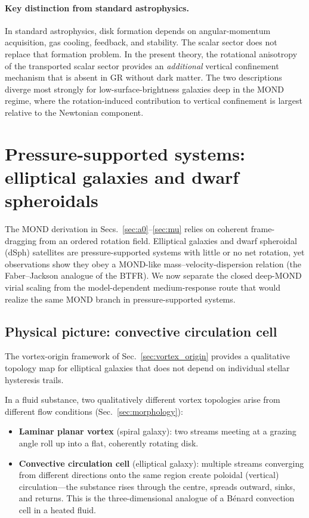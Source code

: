 \documentclass[11pt]{article}
\begin{document}
\paragraph{Key distinction from standard astrophysics.}
In standard astrophysics, disk formation depends on angular-momentum
acquisition, gas cooling, feedback, and stability.  The scalar sector
does not replace that formation problem.  In the present theory, the
rotational anisotropy of the transported scalar sector provides an
\emph{additional} vertical confinement mechanism that is absent in GR
without dark matter.  The two descriptions diverge most strongly for
low-surface-brightness galaxies deep in the MOND regime, where the
rotation-induced contribution to vertical confinement is largest
relative to the Newtonian component.

\section{Pressure-supported systems: elliptical galaxies and dwarf spheroidals}\label{sec:ellipticals}

The MOND derivation in Secs.~\ref{sec:a0}--\ref{sec:mu} relies on
coherent frame-dragging from an ordered rotation field.  Elliptical
galaxies and dwarf spheroidal (dSph) satellites are pressure-supported
systems with little or no net rotation, yet observations show they
obey a MOND-like mass--velocity-dispersion relation
(the Faber--Jackson analogue of the BTFR).  We now separate the
closed deep-MOND virial scaling from the model-dependent
medium-response route that would realize the same MOND branch in
pressure-supported systems.

\subsection{Physical picture: convective circulation cell}\label{sec:convective_cell}

The vortex-origin framework of Sec.~\ref{sec:vortex_origin} provides
a qualitative topology map for elliptical galaxies that does not depend on
individual stellar hysteresis trails.

In a fluid substance, two qualitatively different vortex topologies
arise from different flow conditions (Sec.~\ref{sec:morphology}):
\begin{itemize}
  \item \textbf{Laminar planar vortex} (spiral galaxy):
    two streams meeting at a grazing angle roll up into a flat,
    coherently rotating disk.
  \item \textbf{Convective circulation cell} (elliptical galaxy):
    multiple streams converging from different directions onto the
    same region create poloidal (vertical) circulation---the
    substance rises through the centre, spreads outward, sinks,
    and returns.  This is the three-dimensional analogue of a
    B\'{e}nard convection cell in a heated fluid.
\end{itemize}
\end{document}
